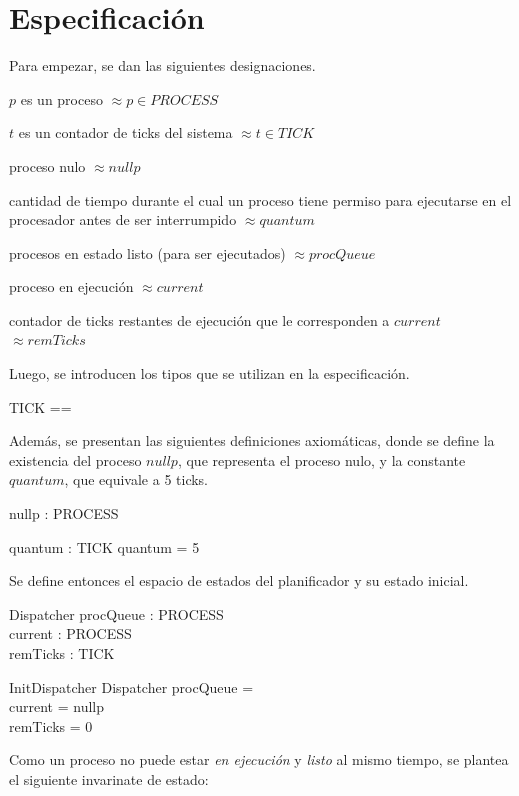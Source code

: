 \documentclass{article}
\newcommand{\desig}[2]{\item #1 $\approx #2$}
\newenvironment{designations}
  {\begin{leftbar}
    \begin{list}{}{\setlength{\labelsep}{0cm}
                   \setlength{\labelwidth}{0cm}
                   \setlength{\listparindent}{0cm}
                   \setlength{\rightmargin}{\leftmargin}}}
  {\end{list}\end{leftbar}}
\begin{document}
\section{Especificación}
Para empezar, se dan las siguientes designaciones.

\begin{designations}
\desig{$p$ es un proceso}{p \in PROCESS}
\desig{$t$ es un contador de ticks del sistema}{t \in TICK}
\desig{proceso nulo}{nullp}
\desig{cantidad de tiempo durante el cual un proceso tiene permiso para ejecutarse en el procesador antes de ser interrumpido}{quantum}
\desig{procesos en estado listo (para ser ejecutados)}{procQueue}
\desig{proceso en ejecución}{current}
\desig{contador de ticks restantes de ejecución que le corresponden a $current$}{remTicks}
\end{designations}

Luego, se introducen los tipos que se utilizan en la especificaci\'on. 

\begin{zed}
    [PROCESS]
\also
    TICK == \nat
\end{zed}

Adem\'as, se presentan las siguientes definiciones axiom\'aticas, donde se define la existencia del proceso $nullp$, que representa el proceso nulo, y la constante $quantum$, que equivale a 5 ticks.

\begin{axdef}
    nullp : PROCESS
\end{axdef}

\begin{axdef}
    quantum : TICK
\where
    quantum = 5
\end{axdef}

Se define entonces el espacio de estados del planificador y su estado inicial.

\begin{schema}{Dispatcher}
    procQueue : \nat \pinj PROCESS \\
    current : PROCESS \\
    remTicks : TICK
\end{schema}

\begin{schema}{InitDispatcher}
    Dispatcher
\where
    procQueue = \emptyset \\
    current = nullp \\
    remTicks = 0
\end{schema}

Como un proceso no puede estar \textit{en ejecución} y \textit{listo} al mismo tiempo, se plantea el siguiente invarinate de estado:
\end{document}
